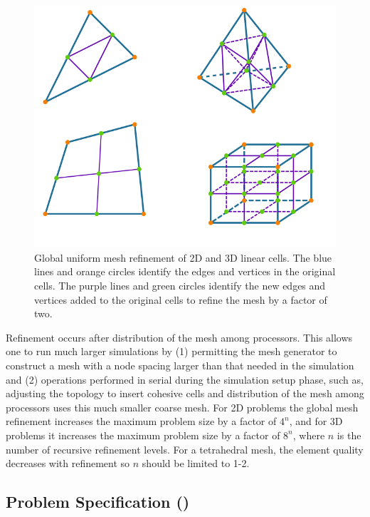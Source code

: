\begin{figure}[htbp]
  \includegraphics[scale=0.6]{runpylith/figs/refinement2x}
  \caption{Global uniform mesh refinement of 2D and 3D linear
    cells. The blue lines and orange circles identify the edges and
    vertices in the original cells. The purple lines and green circles
    identify the new edges and vertices added to the original cells to
    refine the mesh by a factor of two.}
\label{fig:uniform:refinement:2x}
\end{figure}

Refinement occurs after distribution of the mesh among processors.
This allows one to run much larger simulations by (1) permitting the
mesh generator to construct a mesh with a node spacing larger than
that needed in the simulation and (2) operations performed in serial
during the simulation setup phase, such as, adjusting the topology
to insert cohesive cells and distribution of the mesh among processors
uses this much smaller coarse mesh. For 2D problems the global mesh
refinement increases the maximum problem size by a factor of $4^{n}$,
and for 3D problems it increases the maximum problem size by a factor
of $8^{n}$, where $n$ is the number of recursive refinement levels.
For a tetrahedral mesh, the element quality decreases with refinement
so $n$ should be limited to 1-2.


\subsection{Problem Specification (\protect{})}


